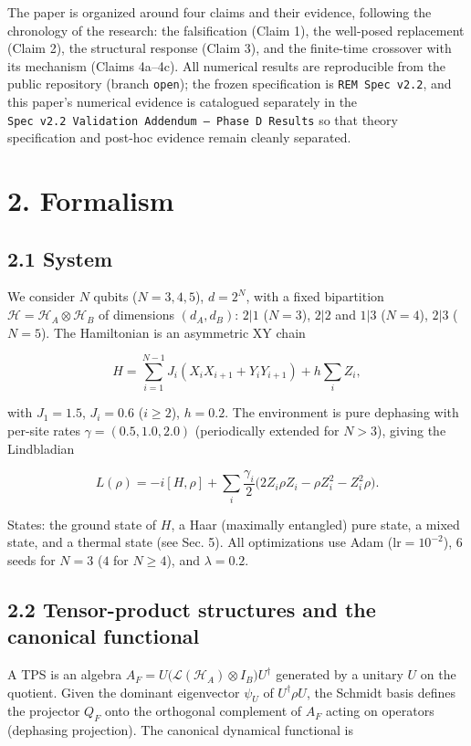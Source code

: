 \documentclass[
]{article}
\begin{document}
The paper is organized around four claims and their evidence, following
the chronology of the research: the falsification (Claim 1), the
well-posed replacement (Claim 2), the structural response (Claim 3), and
the finite-time crossover with its mechanism (Claims 4a--4c). All
numerical results are reproducible from the public repository (branch
\texttt{open}); the frozen specification is \texttt{REM\ Spec\ v2.2},
and this paper's numerical evidence is catalogued separately in the
\texttt{Spec\ v2.2\ Validation\ Addendum\ —\ Phase\ D\ Results} so that
theory specification and post-hoc evidence remain cleanly separated.

\section{2. Formalism}\label{formalism}

\subsection{2.1 System}\label{system}

We consider \(N\) qubits (\(N = 3,4,5\)), \(d = 2^N\), with a fixed
bipartition \(\mathcal{H} = \mathcal{H}_A \otimes \mathcal{H}_B\) of
dimensions \((d_A, d_B)\): \(2|1\) (\(N=3\)), \(2|2\) and \(1|3\)
(\(N=4\)), \(2|3\) (\(N=5\)). The Hamiltonian is an asymmetric XY chain

\[H = \sum_{i=1}^{N-1} J_i (X_i X_{i+1} + Y_i Y_{i+1}) + h \sum_i Z_i,\]

with \(J_1 = 1.5\), \(J_i = 0.6\) (\(i\ge 2\)), \(h = 0.2\). The
environment is pure dephasing with per-site rates
\(\gamma = (0.5, 1.0, 2.0)\) (periodically extended for \(N>3\)), giving
the Lindbladian

\[L(\rho) = -i[H,\rho] + \sum_i \frac{\gamma_i}{2}\big(2 Z_i \rho Z_i -
\rho Z_i^2 - Z_i^2 \rho\big).\]

States: the ground state of \(H\), a Haar (maximally entangled) pure
state, a mixed state, and a thermal state (see Sec. 5). All
optimizations use Adam (\(\mathrm{lr}=10^{-2}\)), \(6\) seeds for
\(N=3\) (\(4\) for \(N\ge4\)), and \(\lambda = 0.2\).

\subsection{2.2 Tensor-product structures and the canonical
functional}\label{tensor-product-structures-and-the-canonical-functional}

A TPS is an algebra
\(A_F = U\big(\mathcal{L}(\mathcal{H}_A)\otimes I_B\big)
U^\dagger\) generated by a unitary \(U\) on the quotient. Given the
dominant eigenvector \(\psi_U\) of \(U^\dagger \rho U\), the Schmidt
basis defines the projector \(Q_F\) onto the orthogonal complement of
\(A_F\) acting on operators (dephasing projection). The canonical
dynamical functional is
\end{document}
